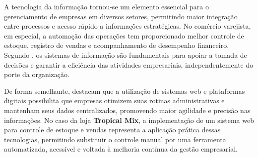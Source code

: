 A tecnologia da informação tornou-se um elemento essencial para o gerenciamento de empresas em diversos setores, permitindo maior integração entre processos e acesso rápido a informações estratégicas. No comércio varejista, em especial, a automação das operações tem proporcionado melhor controle de estoque, registro de vendas e acompanhamento de desempenho financeiro. Segundo \cite{obrien2013}, os sistemas de informação são fundamentais para apoiar a tomada de decisões e garantir a eficiência das atividades empresariais, independentemente do porte da organização.

De forma semelhante, \cite{laudon2022} destacam que a utilização de sistemas web e plataformas digitais possibilita que empresas otimizem suas rotinas administrativas e mantenham seus dados centralizados, promovendo maior agilidade e precisão nas informações. No caso da loja \textbf{Tropical Mix}, a implementação de um sistema web para controle de estoque e vendas representa a aplicação prática dessas tecnologias, permitindo substituir o controle manual por uma ferramenta automatizada, acessível e voltada à melhoria contínua da gestão empresarial.


